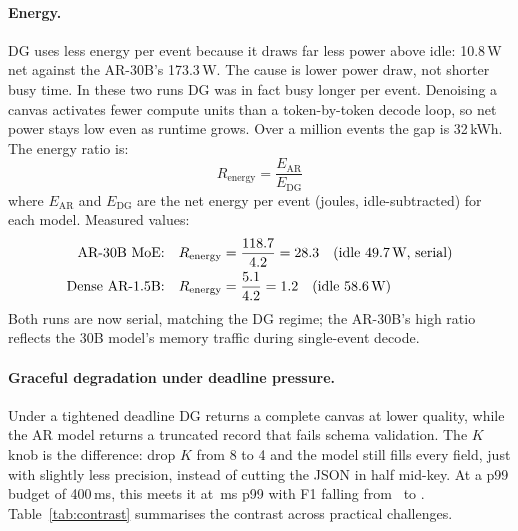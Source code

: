 \paragraph{Energy.}

DG uses less energy per event because it draws far less power above
idle: 10.8\,W net against the AR-30B's 173.3\,W. The cause is lower
power draw, not shorter busy time. In these two runs DG was in fact
busy longer per event. Denoising a canvas activates fewer compute units
than a token-by-token decode loop, so net power stays low even as
runtime grows. Over a million events the gap is 32\,kWh. The energy
ratio is:
\begin{equation}
R_{\mathrm{energy}} = \frac{E_{\mathrm{AR}}}{E_{\mathrm{DG}}}
\end{equation}
where $E_{\mathrm{AR}}$ and $E_{\mathrm{DG}}$ are the net energy per
event (joules, idle-subtracted) for each model. Measured values:
\begin{align}
\text{AR-30B MoE:} \quad & R_{\mathrm{energy}} =
\frac{118.7}{4.2} = 28.3 \quad \text{(idle 49.7\,W, serial)} \\
\text{Dense AR-1.5B:} \quad & R_{\mathrm{energy}} =
\frac{5.1}{4.2} = 1.2 \quad \text{(idle 58.6\,W)}
\end{align}
Both runs are now serial, matching the DG regime; the AR-30B's high
ratio reflects the 30B model's memory traffic during single-event
decode.

\paragraph{Graceful degradation under deadline pressure.}

Under a tightened deadline DG returns a complete canvas at lower
quality, while the AR model returns a truncated record that fails
schema validation. The $K$ knob is the difference: drop $K$ from 8 to 4
and the model still fills every field, just with slightly less
precision, instead of cutting the JSON in half mid-key. At a p99 budget
of 400\,ms, this meets it at \kFourPninetynine\,ms p99 with F1 falling
from \kEightFone\ to \kFourFone. Table~\ref{tab:contrast} summarises
the contrast across practical challenges.

